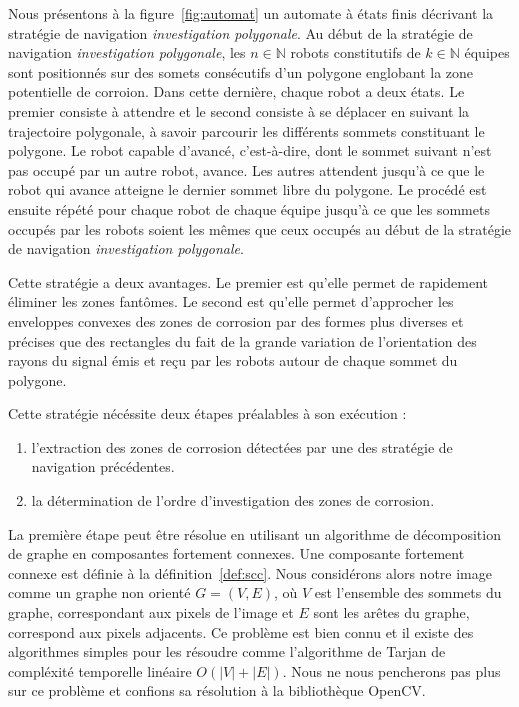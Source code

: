 \documentclass[francais,RandD]{rapportPFE}
\begin{document}
				Nous présentons à la figure~\ref{fig:automat} un automate à états finis décrivant la stratégie de navigation \textit{investigation polygonale}.
				Au début de la stratégie de navigation \textit{investigation polygonale}, les $n \in \mathbb{N}$ robots constitutifs de $k \in \mathbb{N}$ équipes sont positionnés sur des somets consécutifs d'un polygone englobant la zone potentielle de corroion.
				Dans cette dernière, chaque robot a deux états.
				Le premier consiste à attendre et le second consiste à se déplacer en suivant la trajectoire polygonale, à savoir parcourir les différents sommets constituant le polygone.
				Le robot capable d'avancé, c'est-à-dire, dont le sommet suivant n'est pas occupé par un autre robot, avance.
				Les autres attendent jusqu'à ce que le robot qui avance atteigne le dernier sommet libre du polygone.
				Le procédé est ensuite répété pour chaque robot de chaque équipe jusqu'à ce que les sommets occupés par les robots soient les mêmes que ceux occupés au début de la stratégie de navigation \textit{investigation polygonale}.

				Cette stratégie a deux avantages.
				Le premier est qu'elle permet de rapidement éliminer les zones fantômes.
				Le second est qu'elle permet d'approcher les enveloppes convexes des zones de corrosion par des formes plus diverses et précises que des rectangles du fait de la grande variation de l'orientation des rayons du signal émis et reçu par les robots autour de chaque sommet du polygone.

				Cette stratégie nécéssite deux étapes préalables à son exécution :
				\begin{enumerate}
					\item l'extraction des zones de corrosion détectées par une des stratégie de navigation précédentes.
					\item la détermination de l'ordre d'investigation des zones de corrosion.
				\end{enumerate}

				La première étape peut être résolue en utilisant un algorithme de décomposition de graphe en composantes fortement connexes.
				Une composante fortement connexe est définie à la définition~\ref{def:scc}.
				Nous considérons alors notre image comme un graphe non orienté $G = (V, E)$, où  $V$ est l'ensemble des sommets du graphe, correspondant aux pixels de l'image et $E$ sont les arêtes du graphe, correspond aux pixels adjacents.
				Ce problème est bien connu et il existe des algorithmes simples pour les résoudre comme l'algorithme de Tarjan de compléxité temporelle linéaire $O(|V| + |E|)$.
				Nous ne nous pencherons pas plus sur ce problème et confions sa résolution à la bibliothèque OpenCV.
\end{document}
